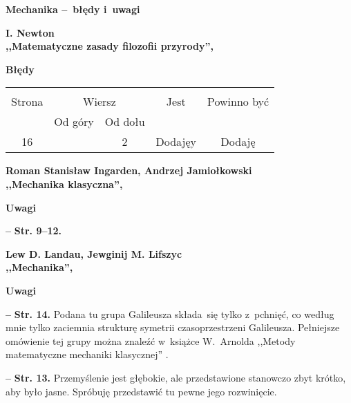 \documentclass[a4paper,11pt]{article}
\newcommand{\spaceTwo}{2em}
\newcommand{\tb}{\textbf}
\newcommand{\noi}{\noindent}
\newcommand{\tb}{\textbf}
\newcommand{\noi}{\noindent}
\newcommand{\start}{\noi \tb{--} {}}
\newcommand{\Str}[1]{\tb{Str. #1.}}
\newcommand{\Center}[1]{\begin{center} #1 \end{center}}
\newcommand{\CenterTB}[1]{\Center{\tb{#1}}}
\newcommand{\Field}[1]{ \begin{center} {\Large \tb{#1} } \end{center} }
\newcommand{\Work}[1]{ \begin{center} {\large \tb{#1}} \end{center} }
\newcommand{\Field}[1]{ \begin{center} {\Large \tb{#1} } \end{center} }
\newcommand{\Work}[1]{ \begin{center} {\large \tb{#1}} \end{center} }
\newcommand{\tb}{\textbf}
\newcommand{\noi}{\noindent}
\newcommand{\start}{\noi \tb{--} {}}
\newcommand{\Str}[1]{\tb{Str. #1.}}
\newcommand{\Center}[1]{\begin{center} #1 \end{center}}
\newcommand{\CenterTB}[1]{\Center{\tb{#1}}}
\newcommand{\Field}[1]{ \begin{center} {\Large \tb{#1} } \end{center} }
\newcommand{\Work}[1]{ \begin{center} {\large \tb{#1}} \end{center} }
\begin{document}



\Field{Mechanika --~błędy i~uwagi}

\vspace{\spaceTwo}



\Work{
  I. Newton \\
  ,,Matematyczne zasady filozofii przyrody'', \cite{Newton11} }

\CenterTB{Błędy}
\begin{center}
  \begin{tabular}{|c|c|c|c|c|}
    \hline
    & \multicolumn{2}{c|}{} & & \\
    Strona & \multicolumn{2}{c|}{Wiersz} & Jest & Powinno być \\ \cline{2-3}
    & Od góry & Od dołu &  &  \\ \hline
    16 & & 2 & Dodajęy & Dodaję \\
    \hline
  \end{tabular}
\end{center}





\Work{
  Roman Stanisław Ingarden, Andrzej Jamiołkowski \\
  ,,Mechanika klasyczna'', \cite{IJ80} }


\CenterTB{Uwagi}

\start \Str{9--12}





\Work{
  Lew D. Landau, Jewginij M. Lifszyc \\
  ,,Mechanika'', \cite{LL06} }


\CenterTB{Uwagi}

\start \Str{14} Podana tu grupa Galileusza składa~się tylko z~pchnięć,
co według mnie tylko zaciemnia strukturę symetrii czasoprzestrzeni
Galileusza. Pełniejsze omówienie tej grupy można znaleźć w~książce
W.~Arnolda ,,Metody matematyczne mechaniki klasycznej'' \cite{Arnold81}.

\start \Str{13} Przemyślenie jest głębokie, ale przedstawione
stanowczo zbyt krótko, aby było jasne. Spróbuję przedstawić tu pewne
jego rozwinięcie.
\end{document}
